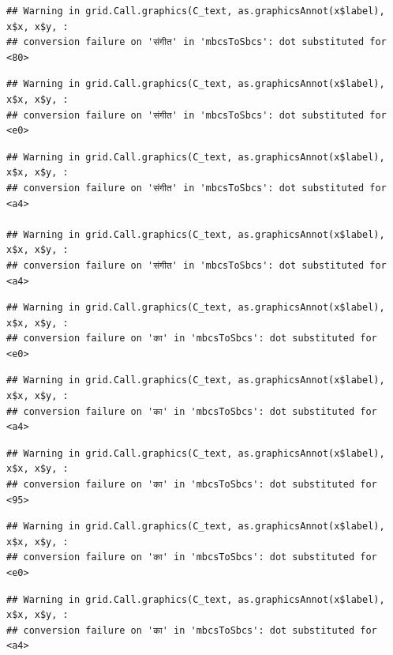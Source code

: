 \documentclass[
]{article}
\begin{document}
\begin{verbatim}
## Warning in grid.Call.graphics(C_text, as.graphicsAnnot(x$label), x$x, x$y, :
## conversion failure on 'संगीत' in 'mbcsToSbcs': dot substituted for <80>
\end{verbatim}

\begin{verbatim}
## Warning in grid.Call.graphics(C_text, as.graphicsAnnot(x$label), x$x, x$y, :
## conversion failure on 'संगीत' in 'mbcsToSbcs': dot substituted for <e0>
\end{verbatim}

\begin{verbatim}
## Warning in grid.Call.graphics(C_text, as.graphicsAnnot(x$label), x$x, x$y, :
## conversion failure on 'संगीत' in 'mbcsToSbcs': dot substituted for <a4>

## Warning in grid.Call.graphics(C_text, as.graphicsAnnot(x$label), x$x, x$y, :
## conversion failure on 'संगीत' in 'mbcsToSbcs': dot substituted for <a4>
\end{verbatim}

\begin{verbatim}
## Warning in grid.Call.graphics(C_text, as.graphicsAnnot(x$label), x$x, x$y, :
## conversion failure on 'का' in 'mbcsToSbcs': dot substituted for <e0>
\end{verbatim}

\begin{verbatim}
## Warning in grid.Call.graphics(C_text, as.graphicsAnnot(x$label), x$x, x$y, :
## conversion failure on 'का' in 'mbcsToSbcs': dot substituted for <a4>
\end{verbatim}

\begin{verbatim}
## Warning in grid.Call.graphics(C_text, as.graphicsAnnot(x$label), x$x, x$y, :
## conversion failure on 'का' in 'mbcsToSbcs': dot substituted for <95>
\end{verbatim}

\begin{verbatim}
## Warning in grid.Call.graphics(C_text, as.graphicsAnnot(x$label), x$x, x$y, :
## conversion failure on 'का' in 'mbcsToSbcs': dot substituted for <e0>
\end{verbatim}

\begin{verbatim}
## Warning in grid.Call.graphics(C_text, as.graphicsAnnot(x$label), x$x, x$y, :
## conversion failure on 'का' in 'mbcsToSbcs': dot substituted for <a4>
\end{verbatim}
\end{document}
